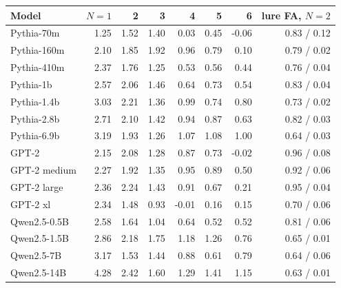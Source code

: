 \begin{tabular}{lrrrrrrr}
\toprule
Model & $N{=}1$ & 2 & 3 & 4 & 5 & 6 & lure FA, $N{=}2$ \\
\midrule
Pythia-70m & 1.25 & 1.52 & 1.40 & 0.03 & 0.45 & -0.06 & 0.83 / 0.12 \\
Pythia-160m & 2.10 & 1.85 & 1.92 & 0.96 & 0.79 & 0.10 & 0.79 / 0.02 \\
Pythia-410m & 2.37 & 1.76 & 1.25 & 0.53 & 0.56 & 0.44 & 0.76 / 0.04 \\
Pythia-1b & 2.57 & 2.06 & 1.46 & 0.64 & 0.73 & 0.54 & 0.83 / 0.04 \\
Pythia-1.4b & 3.03 & 2.21 & 1.36 & 0.99 & 0.74 & 0.80 & 0.73 / 0.02 \\
Pythia-2.8b & 2.71 & 2.10 & 1.42 & 0.94 & 0.87 & 0.63 & 0.82 / 0.03 \\
Pythia-6.9b & 3.19 & 1.93 & 1.26 & 1.07 & 1.08 & 1.00 & 0.64 / 0.03 \\
GPT-2 & 2.15 & 2.08 & 1.28 & 0.87 & 0.73 & -0.02 & 0.96 / 0.08 \\
GPT-2 medium & 2.27 & 1.92 & 1.35 & 0.95 & 0.89 & 0.50 & 0.92 / 0.06 \\
GPT-2 large & 2.36 & 2.24 & 1.43 & 0.91 & 0.67 & 0.21 & 0.95 / 0.04 \\
GPT-2 xl & 2.34 & 1.48 & 0.93 & -0.01 & 0.16 & 0.15 & 0.70 / 0.06 \\
Qwen2.5-0.5B & 2.58 & 1.64 & 1.04 & 0.64 & 0.52 & 0.52 & 0.81 / 0.06 \\
Qwen2.5-1.5B & 2.86 & 2.18 & 1.75 & 1.18 & 1.26 & 0.76 & 0.65 / 0.01 \\
Qwen2.5-7B & 3.17 & 1.53 & 1.44 & 0.88 & 0.61 & 0.79 & 0.64 / 0.06 \\
Qwen2.5-14B & 4.28 & 2.42 & 1.60 & 1.29 & 1.41 & 1.15 & 0.63 / 0.01 \\
\bottomrule
\end{tabular}
